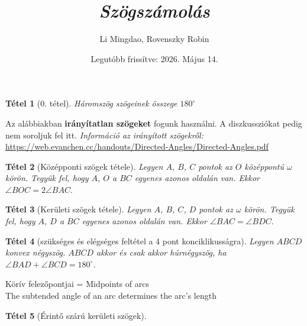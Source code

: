 \documentclass{article}
\title{\textit{\textbf{Szögszámolás}}}
\author{Li Mingdao, Rovenszky Robin}
\date{Legutóbb frissítve: 2026. Május 14.}
\newtheorem{theorem}{Tétel}
\begin{document}
\maketitle
\tableofcontents
\newpage

\begin{theorem}[0. tétel]
    Háromszög szögeinek összege $180^\circ$
\end{theorem}

Az alábbiakban \textbf{irányítatlan szögeket} fogunk használni.
A diszkussziókat pedig nem soroljuk fel itt. \textit{Információ az irányított szögekről: }
\url{https://web.evanchen.cc/handouts/Directed-Angles/Directed-Angles.pdf}
\begin{theorem}[Középponti szögek tétele]
Legyen $A$, $B$, $C$ pontok az $O$ középpontú $\omega$ körön. Tegyük fel, hogy $A$, $O$ a $BC$ egyenes azonos oldalán van. Ekkor $\angle{BOC}=2\angle{BAC}.$
\end{theorem}

\begin{theorem}[Kerületi szögek tétele]
Legyen $A$, $B$, $C$, $D$ pontok az $\omega$ körön. Tegyük fel, hogy $A$, $D$ a $BC$ egyenes azonos oldalán van. Ekkor $\angle{BAC}=\angle{BDC}.$
\end{theorem}

\begin{theorem}[szükséges és elégséges feltétel a 4 pont konciklikusságra]
Legyen $ABCD$ konvex négyszög. $ABCD$ akkor és csak akkor húrnégyszög, ha $\angle{BAD}+\angle{BCD}=180^\circ$.
\end{theorem}

Körív felezőpontjai = Midpoints of arcs\\
The subtended angle of an arc determines the arc's length

\begin{theorem}[Érintő szárú kerületi szögek]
    
\end{theorem}
\end{document}
